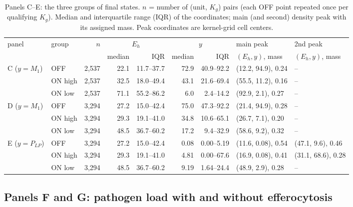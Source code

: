\documentclass[11pt]{article}
\begin{document}
\begin{table}[H]
\centering
\caption{Panels C--E: the three groups of final states. $n$ = number of (unit, $K_g$) pairs
(each OFF point repeated once per qualifying $K_g$). Median and interquartile range
(IQR) of the coordinates; main (and second) density peak with its assigned mass.
Peak coordinates are kernel-grid cell centers.}
\label{tab:fig01-CDE}
\scriptsize
\setlength{\tabcolsep}{3pt}
\begin{tabular}{llrrrrrll}
\toprule
panel & group & $n$ & \multicolumn{2}{c}{$E_h$} & \multicolumn{2}{c}{$y$} & main peak & 2nd peak \\
 & & & median & IQR & median & IQR & $(E_h, y)$, mass & $(E_h, y)$, mass \\
\midrule
C ($y = M_1$) & OFF          & 2{,}537 & 22.1 & 11.7--37.7 & 72.9 & 40.9--92.2 & (12.2, 94.9), 0.24 & -- \\
              & ON high      & 2{,}537 & 32.5 & 18.0--49.4 & 43.1 & 21.6--69.4 & (55.5, 11.2), 0.16 & -- \\
              & ON low       & 2{,}537 & 71.1 & 55.2--86.2 & 6.0 & 2.4--14.2 & (92.9, 2.1), 0.27 & -- \\
D ($y = M_1$) & OFF          & 3{,}294 & 27.2 & 15.0--42.4 & 75.0 & 47.3--92.2 & (21.4, 94.9), 0.28 & -- \\
              & ON high      & 3{,}294 & 29.3 & 19.1--41.0 & 34.8 & 10.6--65.1 & (26.7, 7.1), 0.20 & -- \\
              & ON low       & 3{,}294 & 48.5 & 36.7--60.2 & 17.2 & 9.4--32.9 & (58.6, 9.2), 0.32 & -- \\
E ($y = P_{LP}$) & OFF       & 3{,}294 & 27.2 & 15.0--42.4 & 0.08 & 0.00--5.19 & (11.6, 0.08), 0.54 & (47.1, 9.6), 0.46 \\
              & ON high      & 3{,}294 & 29.3 & 19.1--41.0 & 4.81 & 0.00--67.6 & (16.9, 0.08), 0.41 & (31.1, 68.6), 0.28 \\
              & ON low       & 3{,}294 & 48.5 & 36.7--60.2 & 9.19 & 1.64--24.4 & (48.9, 2.9), 0.28 & -- \\
\bottomrule
\end{tabular}
\end{table}

\subsection{Panels F and G: pathogen load with and without efferocytosis}
\label{sec:fig1-FG}
\end{document}
